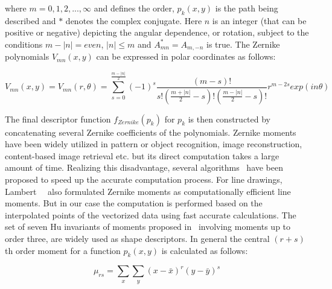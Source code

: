where $m = 0,1,2,...,\infty$ and defines the order, $p_k(x,y)$ is the path being described and $*$ denotes the complex conjugate. Here $n$ is an integer (that can be positive or negative) depicting the angular dependence, or rotation, subject to the conditions $m-\left|n\right|=even$, $\left|n\right|\leq m$ and $A^*_{mn} = A_{m,-n}$ is true. The Zernike polynomials $V_{mn}(x,y)$ can be expressed in polar coordinates as follows:

\begin{equation}
V_{mn}(x,y)=V_{mn}(r,\theta)=\sum_{s=0}^{\frac{m-\left|n\right|}{2}}(-1)^s\frac{(m-s)!}{s!(\frac{m+\left|n\right|}{2}-s)!(\frac{m-\left|n\right|}{2}-s)!}r^{m-2s}exp(in\theta)
\label{eqn:hssg:zernike2}
\end{equation}

The final descriptor function $f_{Zernike}(p_k)$ for $p_k$ is then constructed by concatenating several Zernike coefficients of the polynomials. Zernike moments have been widely utilized in pattern or object recognition, image reconstruction, content-based image retrieval etc. but its direct computation takes a large amount of time. Realizing this disadvantage, several algorithms~\cite{Hosny2008} have been proposed to speed up the accurate computation process. For line drawings, Lambert~\etal~\cite{Lambert1995, Lambert1996} also formulated Zernike moments as computationally efficient line moments. But in our case the computation is performed based on the interpolated points of the vectorized data using fast accurate calculations.
\label{sssec:hssg:hu}
The set of seven Hu invariants of moments proposed in~\cite{Hu1962} involving moments up to order three, are widely used as shape descriptors. In general the central $(r+s)$th order moment for a function $p_k(x,y)$ is calculated as follows:

\begin{equation}
\mu_{rs}=\sum\limits_{x}\sum\limits_{y} (x-\bar{x})^r (y-\bar{y})^s
\label{eqn:hssg:hu1}
\end{equation}

